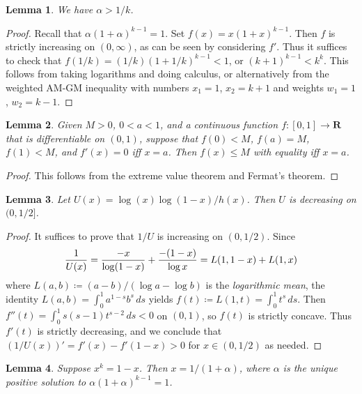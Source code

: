 \documentclass[twoside]{amsart} %
\newtheorem{lemma}{Lemma}
\begin{document}
\begin{lemma} \label{lemma:l2}
We have $\alpha>1/k$.
\end{lemma}

\begin{proof}
Recall that $\alpha(1+\alpha)^{k-1}=1$. Set $f(x)=x(1+x)^{k-1}$.
Then $f$ is strictly increasing on $(0,\infty)$, as can be seen
by considering $f'$. Thus it suffices to check that $f(1/k)=(1/k)(1+1/k)^{k-1}<1$,
or $(k+1)^{k-1}<k^k$. This follows from taking logarithms and doing calculus,
or alternatively from the weighted AM-GM inequality with numbers $x_1=1$, $x_2=k+1$
and weights $w_1=1$, $w_2=k-1$.
\end{proof}

\begin{lemma} \label{lemma:l3}
Given $M>0$, $0<a<1$, and a continuous function $f\colon[0,1]\to\mathbf R$
that is differentiable on $(0,1)$, suppose that $f(0)<M$, $f(a)=M$, $f(1)<M$, and
$f'(x)=0$ iff $x=a$. Then $f(x)\le M$ with equality iff $x=a$. 
\end{lemma}

\begin{proof}
This follows from the extreme value theorem and Fermat's theorem. 
\end{proof}

\begin{lemma} \label{lemma:l4}
Let $U(x)=\log(x)\log(1-x)/h(x)$. Then $U$ is decreasing on $(0,1/2]$.
\end{lemma}

\begin{proof}
It suffices to prove that $1/U$ is increasing on $(0,1/2)$.
Since \begin{equation}
{1\over U(x)}={-x\over\log(1-x)}+{-(1-x)\over\log x}=L(1,1-x)+L(1,x)
\end{equation}
where $L(a,b)\coloneqq(a-b)/(\log a-\log b)$ is the \emph{logarithmic mean},
the identity $L(a,b)=\int_0^1a^{1-s}b^s\,ds$ yields
$f(t)\coloneqq L(1,t)=\int_0^1t^s\,ds$. 
Then $f''(t)=\int_0^1s(s-1)t^{s-2}\,ds<0$ on $(0,1)$, 
so $f(t)$ is strictly concave.
Thus $f'(t)$ is strictly decreasing, and we conclude that 
$(1/U(x))'=f'(x)-f'(1-x)>0$ for $x\in(0,1/2)$ as needed.
\end{proof}


\begin{lemma} \label{lemma:l5}
Suppose $x^k=1-x$. Then $x=1/(1+\alpha)$, where $\alpha$ is the unique
positive solution to $\alpha(1+\alpha)^{k-1}=1$.
\end{lemma}
\end{document}
